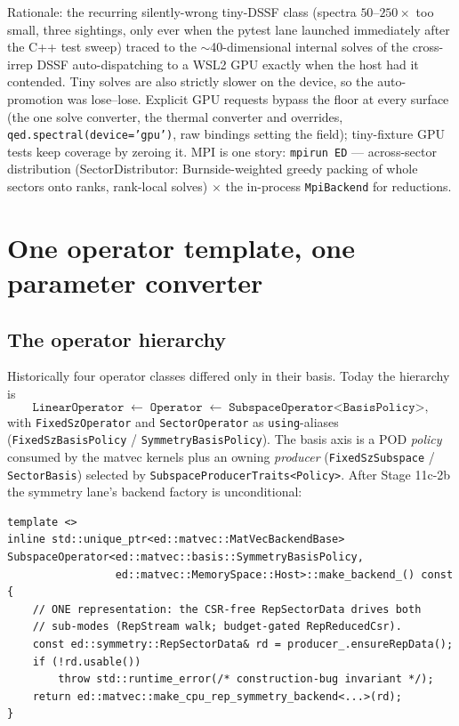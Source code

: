 \documentclass[11pt]{article}
\begin{document}
Rationale: the recurring silently-wrong tiny-DSSF class (spectra
$50$--$250\times$ too small, three sightings, only ever when the pytest
lane launched immediately after the C++ test sweep) traced to the
$\sim$40-dimensional internal solves of the cross-irrep DSSF
auto-dispatching to a WSL2 GPU exactly when the host had it contended.
Tiny solves are also strictly slower on the device, so the auto-promotion
was lose--lose. Explicit GPU requests bypass the floor at every surface
(the one solve converter, the thermal converter and overrides,
\texttt{qed.spectral(device='gpu')}, raw bindings setting the field);
tiny-fixture GPU tests keep coverage by zeroing it. MPI is one story:
\texttt{mpirun ED} --- across-sector distribution (SectorDistributor:
Burnside-weighted greedy packing of whole sectors onto ranks, rank-local
solves) $\times$ the in-process \texttt{MpiBackend} for reductions.

\section{One operator template, one parameter converter}
\label{sec:operator}

\subsection{The operator hierarchy}

Historically four operator classes differed only in their basis. Today the
hierarchy is
\[
  \texttt{LinearOperator} \;\longleftarrow\; \texttt{Operator}
  \;\longleftarrow\; \texttt{SubspaceOperator<BasisPolicy>},
\]
with \texttt{FixedSzOperator} and \texttt{SectorOperator} as
\texttt{using}-aliases (\texttt{FixedSzBasisPolicy} /
\texttt{SymmetryBasisPolicy}). The basis axis is a POD \emph{policy}
consumed by the matvec kernels plus an owning \emph{producer}
(\texttt{FixedSzSubspace} / \texttt{SectorBasis}) selected by
\texttt{SubspaceProducerTraits<Policy>}. After Stage 11c-2b the symmetry
lane's backend factory is unconditional:

\begin{lstlisting}
template <>
inline std::unique_ptr<ed::matvec::MatVecBackendBase>
SubspaceOperator<ed::matvec::basis::SymmetryBasisPolicy,
                 ed::matvec::MemorySpace::Host>::make_backend_() const {
    // ONE representation: the CSR-free RepSectorData drives both
    // sub-modes (RepStream walk; budget-gated RepReducedCsr).
    const ed::symmetry::RepSectorData& rd = producer_.ensureRepData();
    if (!rd.usable())
        throw std::runtime_error(/* construction-bug invariant */);
    return ed::matvec::make_cpu_rep_symmetry_backend<...>(rd);
}
\end{lstlisting}
\end{document}
